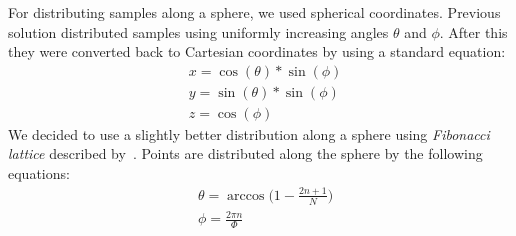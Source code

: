 \documentclass{ctuthesis}
\begin{document}
For distributing samples along a sphere, we used spherical coordinates. Previous solution
distributed samples using uniformly increasing angles $\theta$ and $\phi$. After this 
they were converted back to Cartesian coordinates by using a standard equation:
\begin{equation}
\label{eq:spherical to cartes}
    \begin{aligned}
        &x = \cos(\theta) * \sin(\phi) \\
        &y = \sin(\theta) * \sin(\phi) \\
        &z = \cos(\phi)
    \end{aligned}
\end{equation}
We decided to use a slightly better distribution along a sphere using \textit{Fibonacci lattice}
described by~\cite{gonzalez_2009}. Points are distributed along the sphere by the following 
equations:
\begin{equation}
    \begin{aligned}
        &\theta = \arccos\bigg( 1 - \frac{2n + 1}{N}\bigg) \\
        &\phi = \frac{2\pi n}{\Phi}
    \end{aligned}
\end{equation}
\end{document}
